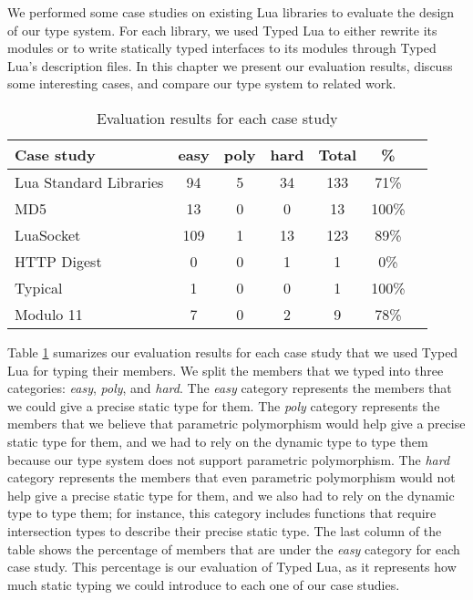 
We performed some case studies on existing Lua libraries
to evaluate the design of our type system.
For each library, we used Typed Lua to either rewrite its modules
or to write statically typed interfaces to its modules through
Typed Lua's description files.
In this chapter we present our evaluation results, discuss
some interesting cases, and compare our type system to
related work.

\begin{table}[!ht]
\begin{center}
\begin{tabular}{|l|c|c|c|c|c|c|}
\hline
\textbf{Case study} & \textbf{easy} & \textbf{poly} & \textbf{hard} & \textbf{Total} & \textbf{\%} \\
\hline
Lua Standard Libraries & 94 & 5 & 34 & 133 & 71\% \\
\hline
MD5 & 13 & 0 & 0 & 13 & 100\% \\
\hline
LuaSocket & 109 & 1 & 13 & 123 & 89\% \\
\hline
HTTP Digest & 0 & 0 & 1 & 1 & 0\% \\
\hline
Typical & 1 & 0 & 0 & 1 & 100\% \\
\hline
Modulo 11 & 7 & 0 & 2 & 9 & 78\% \\
\hline
\end{tabular}
\end{center}
\caption{Evaluation results for each case study}
\label{tab:evalbycase}
\end{table}

Table \ref{tab:evalbycase} sumarizes our evaluation results for each
case study that we used Typed Lua for typing their members.
We split the members that we typed into three categories:
\emph{easy}, \emph{poly}, and \emph{hard}.
The \emph{easy} category represents the members that we could give
a precise static type for them.
The \emph{poly} category represents the members that we believe that
parametric polymorphism would help give a precise static type for them,
and we had to rely on the dynamic type to type them because our
type system does not support parametric polymorphism.
The \emph{hard} category represents the members that even parametric
polymorphism would not help give a precise static type for them,
and we also had to rely on the dynamic type to type them;
for instance, this category includes functions that require
intersection types to describe their precise static type.
The last column of the table shows the percentage of members that
are under the \emph{easy} category for each case study.
This percentage is our evaluation of Typed Lua, as it
represents how much static typing we could introduce to each one of
our case studies.

